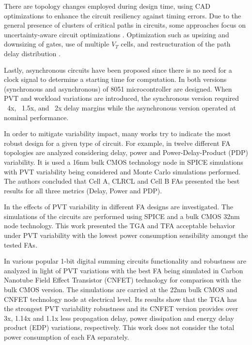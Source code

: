 \documentclass[pgmicro,diss,english]{iiufrgs}
\begin{document}
There are topology changes employed during design time, using CAD optimizations to enhance the circuit resiliency against timing errors. Due to the general presence of clusters of critical paths in circuits,  some approaches focus on uncertainty-aware circuit optimizations \cite{bai2002uncertainty}. Optimization such as upsizing and downsizing of gates, use of multiple $V_T$ cells, and restructuration of the path delay distribution \cite{kahng2010slack}.

Lastly, asynchronous circuits have been proposed since there is no need for a clock signal to determine a starting time for computation. In \cite{chang2013synchronous} both versions (synchronous and  asynchronous) of 8051 microcontroller are designed. When PVT and workload variations are introduced, the synchronous version required ~4x, ~1.5x, and ~2x delay margins while the asynchronous version operated at nominal performance.

In order to mitigate variability impact, many works try to indicate the most robust design for a given type of circuit. For example, in \cite{dokania2013investigation} twelve different FA topologies are analyzed considering delay, power and Power-Delay-Product (PDP) variability. It is used a 16nm bulk CMOS technology node in SPICE simulations with PVT variability being considered and Monte Carlo simulations performed. The authors concluded that Cell A, CLRCL and Cell B FAs presented the best results for all three metrics (Delay, Power and PDP).

In \cite{ames2016investigating} the effects of PVT variability in different FA designs are investigated. The simulations of the circuits are performed using SPICE and a bulk CMOS 32nm node technology. This work presented the TGA and TFA acceptable behavior under PVT variability with the lowest power consumption sensibility amongst the tested FAs.

In \cite{islam2011design} various popular 1-bit digital summing circuits functionality and robustness are analyzed in light of PVT variations with the best FA being simulated in Carbon Nanotube Field Effect Transistor (CNFET) technology for comparison with the bulk CMOS version. The simulations are carried at the 22nm bulk CMOS and CNFET technology node at electrical level. Its results show that the TGA has the strongest PVT variability robustness and its CNFET version provides over 3x, 1.14x and 1.1x less propagation delay, power dissipation and energy delay product (EDP) variations, respectively. This work does not consider the total power consumption of each FA separately.
\end{document}
